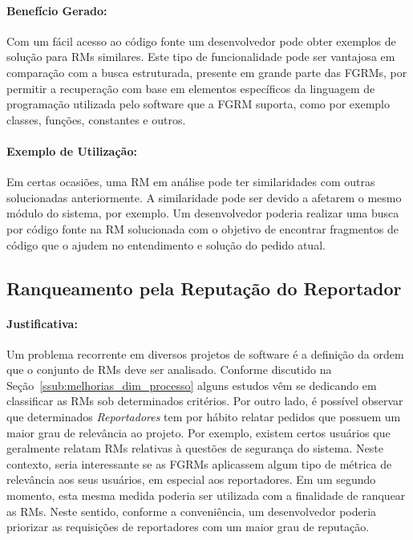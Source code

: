 \paragraph{Benefício Gerado:}
\label{par:beneficios_s02}

Com um fácil acesso ao código fonte um desenvolvedor pode obter exemplos de
solução para RMs similares. Este tipo de funcionalidade pode ser vantajosa em
comparação com a busca estruturada, presente em grande parte das FGRMs, por
permitir a recuperação com base em elementos específicos da linguagem de
programação utilizada pelo software que a FGRM suporta, como por exemplo
classes, funções, constantes e outros.

\paragraph{Exemplo de Utilização:}
\label{par:exemplo_s02}

Em certas ocasiões, uma RM em análise pode ter similaridades com outras
solucionadas anteriormente. A similaridade pode ser devido a afetarem o mesmo
módulo do sistema, por exemplo. Um desenvolvedor poderia realizar uma busca por
código fonte na RM solucionada com o objetivo de encontrar fragmentos de código
que o ajudem no entendimento e solução do pedido atual.

\subsection{Ranqueamento pela Reputação do Reportador}
\label{sub:diferenciacao_do_reportdor}


\paragraph{Justificativa:}
\label{par:justificativa_s03}

Um problema recorrente em diversos projetos de software é a definição da ordem
que o conjunto de RMs deve ser analisado. Conforme discutido na
Seção~\ref{ssub:melhorias_dim_processo} alguns estudos vêm se dedicando em
classificar as RMs sob determinados critérios. Por outro lado, é possível
observar que determinados \textit{Reportadores} tem por hábito relatar pedidos
que possuem um maior grau de relevância ao projeto. Por exemplo, existem certos
usuários que geralmente relatam RMs relativas à questões de segurança do
sistema. Neste contexto, seria interessante se as FGRMs aplicassem algum tipo de
métrica de relevância aos seus usuários, em especial aos reportadores. Em um
segundo momento, esta mesma medida poderia ser utilizada com a finalidade de
ranquear as RMs. Neste sentido, conforme a conveniência, um desenvolvedor
poderia priorizar as requisições de reportadores com um maior grau de reputação.

